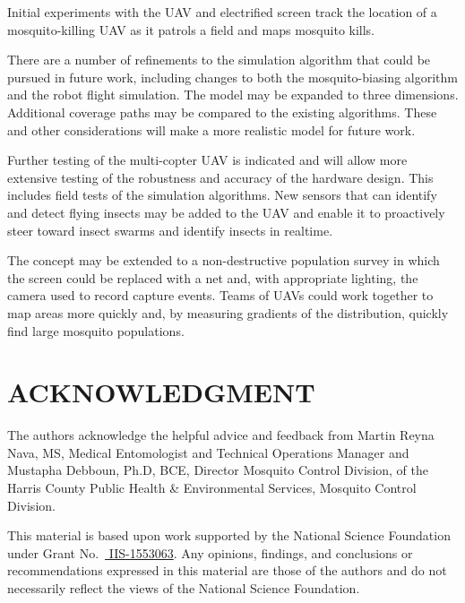 \documentclass[letterpaper, 10 pt, conference]{ieeeconf}  %
\begin{document}
Initial experiments with the UAV and electrified screen track the location of a mosquito-killing UAV as it patrols a field and maps mosquito kills.  

There are a number of refinements to the simulation algorithm that could be pursued in future work, including changes to both the mosquito-biasing algorithm and the robot flight simulation.  The model may be expanded to three dimensions.  Additional coverage paths may be compared to the existing algorithms.  These and other considerations will make a more realistic model for future work.  

Further testing of the multi-copter UAV is indicated and will allow more extensive testing of the robustness and accuracy of the hardware design.  This includes field tests of the simulation algorithms.  New sensors that can identify and detect flying insects \cite{chen2014flying} may be added to the UAV and enable it to proactively steer toward insect swarms and identify insects in realtime.

The concept may be extended to a non-destructive population survey in which the screen could be replaced with a net and, with appropriate lighting, the camera used to record capture events.  Teams of UAVs could work together to map areas more quickly and, by measuring gradients of the distribution, quickly find large mosquito populations.



\section*{ACKNOWLEDGMENT}
The authors acknowledge the helpful advice and feedback from Martin Reyna Nava, MS, Medical Entomologist and Technical Operations Manager and Mustapha Debboun, Ph.D, BCE, Director Mosquito Control Division, of the Harris County Public Health \& Environmental Services, Mosquito Control Division.

This material is based upon work supported by the National Science Foundation under Grant No.\ 
\href{http://nsf.gov/awardsearch/showAward?AWD_ID=1553063}{ IIS-1553063}.
Any opinions, findings, and conclusions or recommendations expressed in this material are those of the authors and do not necessarily reflect the views of the National Science Foundation.
\end{document}
